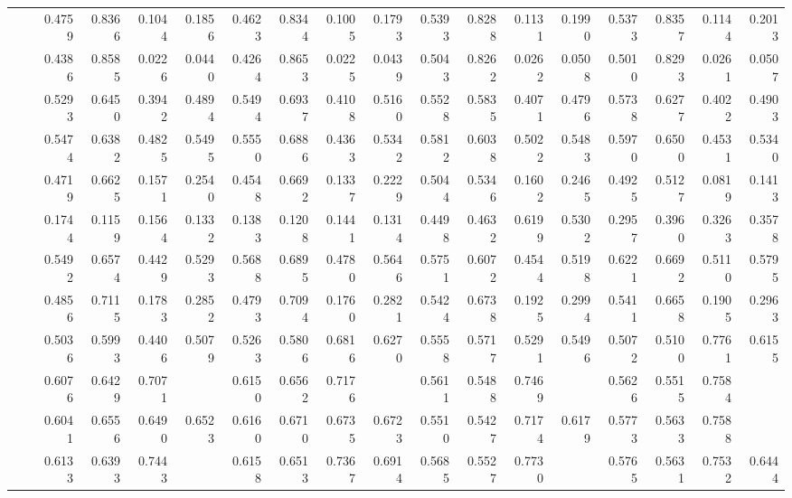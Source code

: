 \begin{table*}[t]
{\begin{tabular}{|l|l|r|r|r|r|r|r|r|r|r|r|r|r|r|r|r|r|}
			\multirow{11}{*}{\rotatebox{90}{\Citeseer}} 
			&\ATC       & 0.4759 & 0.8366 & 0.1044 & 0.1856 & 0.4623 & 0.8344 & 0.1005 & 0.1793 & 0.5393 & 0.8288 & 0.1131 & 0.1990 & 0.5373 & 0.8357 & 0.1144 & 0.2013 \\
			&\CTC       & 0.4386 & 0.8585 & 0.0226 & 0.0440 & 0.4264 & 0.8653 & 0.0225 & 0.0439 & 0.5043 & 0.8262 & 0.0262 & 0.0508 & 0.5010 & 0.8293 & 0.0261 & 0.0507 \\\cline{2-18}
			&\MAML      & 0.5293 & 0.6450 & 0.3942 & 0.4894 & 0.5494 & 0.6937 & 0.4108 & 0.5160 & 0.5528 & 0.5835 & 0.4071 & 0.4796 & 0.5738 & 0.6277 & 0.4022 & 0.4903 \\
			&\Reptile   & 0.5474 & 0.6382 & 0.4825 & 0.5495 & 0.5550 & 0.6886 & 0.4363 & 0.5342 & 0.5812 & 0.6038 & 0.5022 & 0.5483 & 0.5970 & 0.6500 & 0.4531 & 0.5340 \\
			&\Featrans  & 0.4719 & 0.6625 & 0.1571 & 0.2540 & 0.4548 & 0.6692 & 0.1337 & 0.2229 & 0.5044 & 0.5346 & 0.1602 & 0.2465 & 0.4925 & 0.5127 & 0.0819 & 0.1413 \\
			&\PN        & 0.1744 & 0.1159 & 0.1564 & 0.1332 & 0.1383 & 0.1208 & 0.1441 & 0.1314 & 0.4498 & 0.4632 & 0.6199 & 0.5302 & 0.2957 & 0.3960 & 0.3263 & 0.3578 \\\cline{2-18}
			&\Supervise & 0.5492 & 0.6574 & 0.4429 & 0.5293 & 0.5688 & 0.6895 & 0.4780 & 0.5646 & 0.5751 & 0.6072 & 0.4544 & 0.5198 & 0.6221 & 0.6692 & 0.5110 & 0.5795 \\
			&\ICSGNN    & 0.4856 & 0.7115 & 0.1783 & 0.2852 & 0.4793 & 0.7094 & 0.1760 & 0.2821 & 0.5424 & 0.6738 & 0.1925 & 0.2994 & 0.5411 & 0.6658 & 0.1905 & 0.2963 \\
			&\AQDGNN    &0.5036	&0.5993	&0.4406	&0.5079  &0.5263	&0.5806	&0.6816	&0.6270 &0.5558	&0.5717	&0.5291	&0.5496 &0.5072	&0.5100	&0.7761	&0.6155\\\cline{2-18}
			&\CGNPIP    & 0.6076 & 0.6429 & 0.7071 & \cellcolor{LightCyan}{0.6734} & 0.6150 & 0.6562 & 0.7176 & \cellcolor{LightCyan}{0.6855} & 0.5611 & 0.5488 & 0.7469 & \cellcolor{LightCyan}{0.6327} & 0.5626 & 0.5515 & 0.7584 & \cellcolor{LightCyan}{0.6386} \\
			&\CGNPMLP   & 0.6041 & 0.6556 & 0.6490 & 0.6523 & 0.6160 & 0.6710 & 0.6735 & 0.6723 & 0.5510 & 0.5427 & 0.7174 & 0.6179 & 0.5773 & 0.5633 & 0.7588 & \cellcolor{LightRed}{0.6466} \\
			&\CGNPGNN   & 0.6133 & 0.6393 & 0.7443 & \cellcolor{LightRed}{0.6878} &  0.6158 & 0.6513 & 0.7367 &\cellcolor{LightRed} {0.6914} & 0.5685 & 0.5527 & 0.7730 & \cellcolor{LightRed}{0.6446} & 0.5765 & 0.5631 & 0.7532 & 0.6444\\\hline\hline
			

\end{tabular}}
\end{table*}
